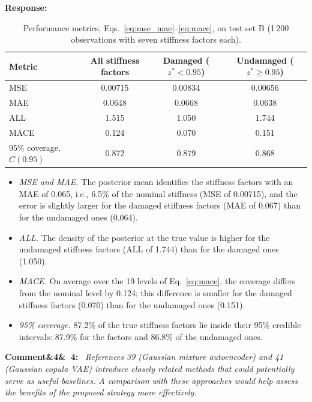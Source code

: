 \documentclass[11pt]{article}
\newenvironment{rcomment}[1]{\par\bigskip\noindent\textbf{Comment\ifx&#1&\else\ #1\fi:}\ \itshape}{\par}
\newenvironment{response}{\par\smallskip\noindent\color{resp}\textbf{Response:}\ }{\par}
\begin{document}
\begin{response}
	\begin{table}[H]
		\centering\small
		\caption{Performance metrics, Eqs.~\eqref{eq:mse_mae}--\eqref{eq:mace}, on test set B (1\,200 observations with seven
			stiffness factors each).}
		\label{tab:metricsB}
		\begin{tabular}{lccc}
			\toprule
			Metric & All stiffness factors & Damaged ($z^*<0.95$) & Undamaged ($z^*\ge0.95$) \\
			\midrule
			MSE & 0.00715 & 0.00834 & 0.00656 \\
			MAE & 0.0648 & 0.0668 & 0.0638 \\
			ALL & 1.515 & 1.050 & 1.744 \\
			MACE & 0.124 & 0.070 & 0.151 \\
			95\% coverage, $C(0.95)$ & 0.872 & 0.879 & 0.868 \\
			\bottomrule
		\end{tabular}
	\end{table}
\end{response}

\begin{itemize}[leftmargin=*]
	\item \emph{MSE and MAE.} The posterior mean identifies the stiffness factors with an MAE of 0.065, i.e., 6.5\% of the
	nominal stiffness (MSE of 0.00715), and the error is slightly larger for the damaged stiffness factors (MAE of 0.067)
	than for the undamaged ones (0.064).
	\item \emph{ALL.} The density of the posterior at the true value is higher for the undamaged stiffness factors (ALL of
	1.744) than for the damaged ones (1.050).
	\item \emph{MACE.} On average over the 19 levels of Eq.~\eqref{eq:mace}, the coverage differs from the nominal level by
	0.124; this difference is smaller for the damaged stiffness factors (0.070) than for the undamaged ones (0.151).
	\item \emph{95\% coverage.} 87.2\% of the true stiffness factors lie inside their 95\% credible intervals: 87.9\% for the factors and 86.8\% of the undamaged ones.
\end{itemize}


%

\begin{rcomment}{4}
References 39 (Gaussian mixture autoencoder) and 41 (Gaussian copula VAE) introduce closely related methods that could
potentially serve as useful baselines. A comparison with these approaches would help assess the benefits of the proposed
strategy more effectively.
\end{rcomment}
\end{document}
